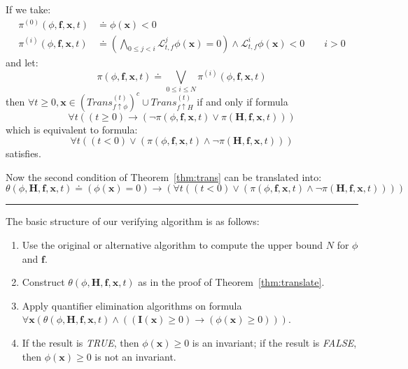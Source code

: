 \documentclass{jssc}
\newcommand{\rulex}{\hfill\rule{1mm}{3mm}}
\begin{document}
If we take:
	\begin{align*}
		\pi^{(0)}(\phi, \boldsymbol{f}, \boldsymbol{x}, t) &\doteq \phi(\boldsymbol{x}) < 0 \\
		\pi^{(i)}(\phi, \boldsymbol{f}, \boldsymbol{x}, t) &\doteq (\bigwedge_{0 \leq j < i} \mathcal{L}_{t, f}^j \phi(\boldsymbol{x}) = 0) \wedge \mathcal{L}_{t, f}^i \phi(\boldsymbol{x}) < 0 \qquad i > 0
	\end{align*}
and let:
	\begin{equation*}
		\pi(\phi, \boldsymbol{f}, \boldsymbol{x}, t) \doteq \bigvee_{0 \leq i \leq N} \pi^{(i)}(\phi, \boldsymbol{f}, \boldsymbol{x}, t)
	\end{equation*}
then $\forall t \geq 0, \boldsymbol{x} \in (Trans_{f \uparrow \phi}^{(t)})^c \cup Trans_{f \uparrow H}^{(t)}$ if and only if formula
	\begin{equation*}
		\forall t ((t \geq 0) \rightarrow (\neg \pi(\phi, \boldsymbol{f}, \boldsymbol{x}, t) \vee \pi(\boldsymbol{H}, \boldsymbol{f}, \boldsymbol{x}, t)))
	\end{equation*}
which is equivalent to formula:
	\begin{equation*}
		\forall t ((t < 0) \vee (\pi(\phi, \boldsymbol{f}, \boldsymbol{x}, t) \wedge \neg \pi(\boldsymbol{H}, \boldsymbol{f}, \boldsymbol{x}, t)))
	\end{equation*}
satisfies.

Now the second condition of Theorem~\ref{thm:trans} can be translated into:
	\begin{equation*}
		\theta(\phi ,\boldsymbol{H}, \boldsymbol{f}, \boldsymbol{x}, t) \doteq (\phi(\boldsymbol{x}) = 0) \rightarrow (\forall t ((t < 0) \vee (\pi(\phi, \boldsymbol{f}, \boldsymbol{x}, t) \wedge \neg \pi(\boldsymbol{H}, \boldsymbol{f}, \boldsymbol{x}, t))))
	\end{equation*}
\rulex

The basic structure of our verifying algorithm is as follows:
\begin{enumerate}
	\item Use the original or alternative algorithm to compute the upper bound $N$ for $\phi$ and $\boldsymbol{f}$.
	\item Construct $\theta(\phi ,\boldsymbol{H}, \boldsymbol{f}, \boldsymbol{x}, t)$ as in the proof of Theorem~\ref{thm:translate}.
	\item Apply quantifier elimination algorithms on formula $\forall \boldsymbol{x} (\theta(\phi, \boldsymbol{H}, \boldsymbol{f}, \boldsymbol{x}, t) \wedge ((\boldsymbol{I}(\boldsymbol{x}) \geq 0) \rightarrow (\phi(\boldsymbol{x}) \geq 0)))$.
	\item If the result is \emph{TRUE}, then $\phi(\boldsymbol{x}) \geq 0$ is an invariant; if the result is \emph{FALSE}, then $\phi(\boldsymbol{x}) \geq 0$ is not an invariant.
\end{enumerate}
\end{document}
